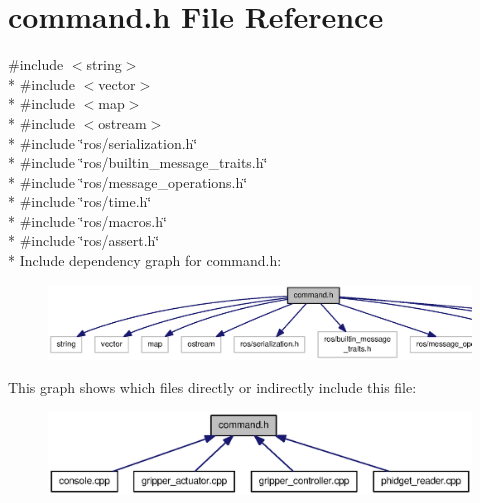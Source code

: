 \section{command.\-h File Reference}
\label{command_8h}
{\ttfamily \#include $<$string$>$}\\*
{\ttfamily \#include $<$vector$>$}\\*
{\ttfamily \#include $<$map$>$}\\*
{\ttfamily \#include $<$ostream$>$}\\*
{\ttfamily \#include \char`\"{}ros/serialization.\-h\char`\"{}}\\*
{\ttfamily \#include \char`\"{}ros/builtin\-\_\-message\-\_\-traits.\-h\char`\"{}}\\*
{\ttfamily \#include \char`\"{}ros/message\-\_\-operations.\-h\char`\"{}}\\*
{\ttfamily \#include \char`\"{}ros/time.\-h\char`\"{}}\\*
{\ttfamily \#include \char`\"{}ros/macros.\-h\char`\"{}}\\*
{\ttfamily \#include \char`\"{}ros/assert.\-h\char`\"{}}\\*
Include dependency graph for command.\-h\-:\nopagebreak
\begin{figure}[H]
\begin{center}
\leavevmode
\includegraphics[width=350pt]{command_8h__incl}
\end{center}
\end{figure}
This graph shows which files directly or indirectly include this file\-:\nopagebreak
\begin{figure}[H]
\begin{center}
\leavevmode
\includegraphics[width=350pt]{command_8h__dep__incl}
\end{center}
\end{figure}
